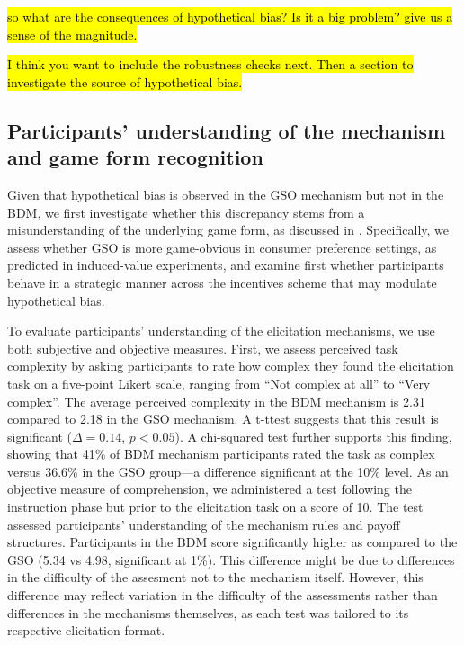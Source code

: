 \documentclass[12pt]{article}
\begin{document}
\hl{so what are the consequences of hypothetical bias? Is it a big problem? give us a sense of the magnitude.}

\hl{I think you want to include the robustness checks next. Then a section to investigate the source of hypothetical bias.}

\subsection{Participants' understanding of the mechanism and game form recognition}

Given that hypothetical bias is observed in the GSO mechanism but not in the BDM, we first investigate whether this discrepancy stems from a misunderstanding of the underlying game form, as discussed in \citet{cason_misconceptions_2014}. Specifically, we assess whether GSO is more game-obvious in consumer preference settings, as predicted in induced-value experiments, and examine first whether participants behave in a strategic manner across the incentives scheme that may modulate hypothetical bias.

To evaluate participants’ understanding of the elicitation mechanisms, we use both subjective and objective measures. First, we assess perceived task complexity by asking participants to rate how complex they found the elicitation task on a five-point Likert scale, ranging from “Not complex at all” to “Very complex”. The average perceived complexity in the BDM mechanism is 2.31 compared to 2.18 in the GSO mechanism. A t-ttest suggests that this result is significant (\(\Delta = 0.14\), \(p < 0.05\)). A chi-squared test further supports this finding, showing that 41\% of BDM mechanism participants rated the task as complex versus 36.6\% in the GSO group—a difference significant at the 10\% level.
As an objective measure of comprehension, we administered a test following the instruction phase but prior to the elicitation task on a score of 10. The test assessed participants’ understanding of the mechanism rules and payoff structures. Participants in the BDM score significantly higher as compared to the GSO (5.34 vs 4.98, significant at 1\%). This difference might be due to differences in the difficulty of the assesment not to the mechanism itself. However, this difference may reflect variation in the difficulty of the assessments rather than differences in the mechanisms themselves, as each test was tailored to its respective elicitation format.
\end{document}
